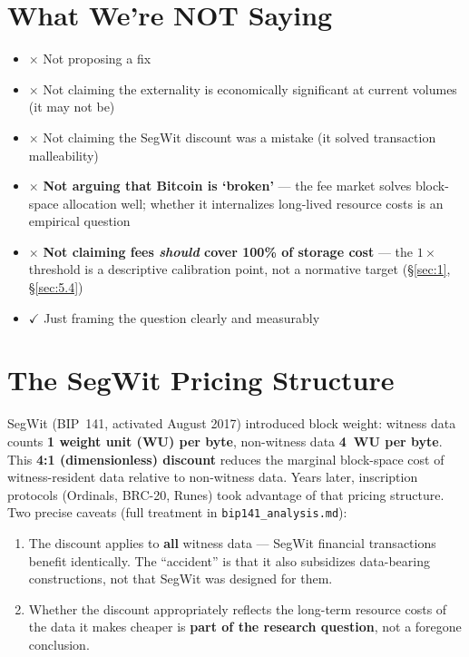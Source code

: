 \documentclass[11pt]{article}
\begin{document}
\section{What We're NOT Saying}\label{sec:2}
\begin{itemize}[nosep]
  \item $\times$ Not proposing a fix
  \item $\times$ Not claiming the externality is economically significant at current volumes (it may not be)
  \item $\times$ Not claiming the SegWit discount was a mistake (it solved transaction malleability)
  \item $\times$ \textbf{Not arguing that Bitcoin is `broken'} --- the fee market solves block-space allocation well; whether it internalizes long-lived resource costs is an empirical question
  \item $\times$ \textbf{Not claiming fees \emph{should} cover 100\% of storage cost} --- the $1\times$ threshold is a descriptive calibration point, not a normative target (\S\ref{sec:1}, \S\ref{sec:5.4})
  \item $\checkmark$ Just framing the question clearly and measurably
\end{itemize}

\section{The SegWit Pricing Structure}\label{sec:3}
SegWit (BIP~141, activated August 2017) introduced block weight: witness data counts \textbf{1 weight unit (WU) per byte}, non-witness data \textbf{4~WU per byte}. This \textbf{4:1 (dimensionless) discount} reduces the marginal block-space cost of witness-resident data relative to non-witness data. Years later, inscription protocols (Ordinals, BRC-20, Runes) took advantage of that pricing structure. Two precise caveats (full treatment in \texttt{bip141\_analysis.md}):
\begin{enumerate}[nosep]
  \item The discount applies to \textbf{all} witness data --- SegWit financial transactions benefit identically. The ``accident'' is that it also subsidizes data-bearing constructions, not that SegWit was designed for them.
  \item Whether the discount appropriately reflects the long-term resource costs of the data it makes cheaper is \textbf{part of the research question}, not a foregone conclusion.
\end{enumerate}
\end{document}
